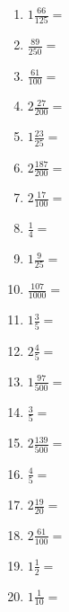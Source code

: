 \documentclass[12pt]{article}
\begin{document}
\begin{enumerate}
\item \large $ 1 \frac{66}{125} = $ \vspace{1.5cm}
\item \large $ \frac{89}{250} = $ \vspace{1.5cm}
\newpage
\item \large $ \frac{61}{100} = $ \vspace{1.5cm}
\item \large $ 2 \frac{27}{200} = $ \vspace{1.5cm}
\item \large $ 1 \frac{23}{25} = $ \vspace{1.5cm}
\item \large $ 2 \frac{187}{200} = $ \vspace{1.5cm}
\item \large $ 2 \frac{17}{100} = $ \vspace{1.5cm}
\item \large $ \frac{1}{4} = $ \vspace{1.5cm}
\item \large $ 1 \frac{9}{25} = $ \vspace{1.5cm}
\item \large $ \frac{107}{1000} = $ \vspace{1.5cm}
\item \large $ 1 \frac{3}{5} = $ \vspace{1.5cm}
\item \large $ 2 \frac{4}{5} = $ \vspace{1.5cm}
\newpage
\item \large $ 1 \frac{97}{500} = $ \vspace{1.5cm}
\item \large $ \frac{3}{5} = $ \vspace{1.5cm}
\item \large $ 2 \frac{139}{500} = $ \vspace{1.5cm}
\item \large $ \frac{4}{5} = $ \vspace{1.5cm}
\item \large $ 2 \frac{19}{20} = $ \vspace{1.5cm}
\item \large $ 2 \frac{61}{100} = $ \vspace{1.5cm}
\item \large $ 1 \frac{1}{2} = $ \vspace{1.5cm}
\item \large $ 1 \frac{1}{10} = $ \vspace{1.5cm}

\end{enumerate}
\end{document}
